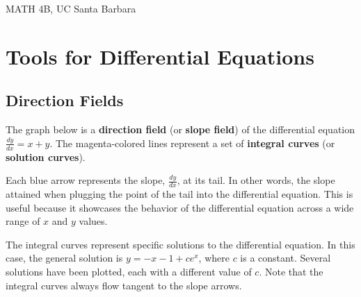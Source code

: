 

\maketitle

\begin{center}
	MATH 4B, UC Santa Barbara
\end{center}

\section{Tools for Differential Equations}
\subsection{Direction Fields}
The graph below is a \textbf{direction field} (or \textbf{slope field}) of the differential equation $\frac{dy}{dx} = x + y$. The magenta-colored lines represent a set of \textbf{integral curves} (or \textbf{solution curves}).

Each blue arrow represents the slope, $\frac{dy}{dx}$, at its tail. In other words, the slope attained when plugging the point of the tail into the differential equation. This is useful because it showcases the behavior of the differential equation across a wide range of $x$ and $y$ values.

The integral curves represent specific solutions to the differential equation. In this case, the general solution is $y = -x - 1 + ce^x$, where $c$ is a constant. Several solutions have been plotted, each with a different value of $c$. Note that the integral curves always flow tangent to the slope arrows.

\begin{center}
\end{center}

